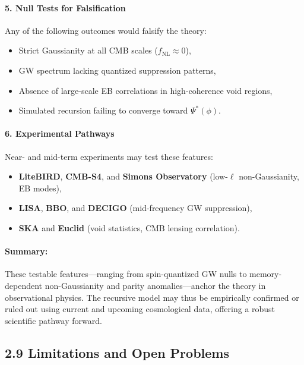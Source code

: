 \paragraph{5. Null Tests for Falsification}

Any of the following outcomes would falsify the theory:
\begin{itemize}
    \item Strict Gaussianity at all CMB scales (\( f_{\text{NL}} \approx 0 \)),
    \item GW spectrum lacking quantized suppression patterns,
    \item Absence of large-scale EB correlations in high-coherence void regions,
    \item Simulated recursion failing to converge toward \( \Psi^*(\phi) \).
\end{itemize}

\paragraph{6. Experimental Pathways}

Near- and mid-term experiments may test these features:
\begin{itemize}
    \item \textbf{LiteBIRD}, \textbf{CMB-S4}, and \textbf{Simons Observatory} (low-\( \ell \) non-Gaussianity, EB modes),
    \item \textbf{LISA}, \textbf{BBO}, and \textbf{DECIGO} (mid-frequency GW suppression),
    \item \textbf{SKA} and \textbf{Euclid} (void statistics, CMB lensing correlation).
\end{itemize}

\paragraph{Summary:}

These testable features—ranging from spin-quantized GW nulls to memory-dependent non-Gaussianity and parity anomalies—anchor the theory in observational physics. The recursive model may thus be empirically confirmed or ruled out using current and upcoming cosmological data, offering a robust scientific pathway forward.

\subsection*{2.9 Limitations and Open Problems}

